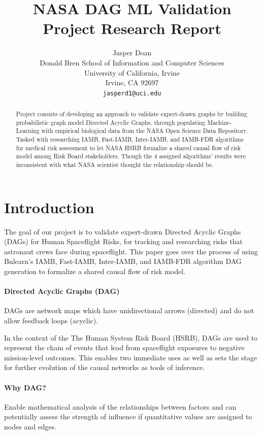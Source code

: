 \documentclass{article}
\title{NASA DAG ML Validation Project Research Report}
\author{
  Jasper Doan \\
  Donald Bren School of Information and Computer Sciences\\
  University of California, Irvine\\
  Irvine, CA 92697 \\
  \texttt{jasperd1@uci.edu} \\
}
\begin{document}
\maketitle
\begin{abstract}
Project consists of developing an approach to validate expert-drawn graphs by building probabilistic graph model Directed Acyclic Graphs, through populating Machine-Learning with empirical biological data from the NASA Open Science Data Repository. 
Tasked with researching IAMB, Fast-IAMB, Inter-IAMB, and IAMB-FDR algorithms for medical risk assessment to let NASA HSRB formalize a shared causal flow of risk model among Risk Board stakeholders. 
Though the 4 assigned algorithms' results were inconsistent with what NASA scientist thought the relationship should be. 
\end{abstract}




\section{Introduction}
The goal of our project is to validate expert-drawn Directed Acyclic Graphs (DAGs) for Human Spaceflight Risks, for tracking and researching risks that astronaut crews face during spaceflight.
This paper goes over the process of using Bnlearn's IAMB, Fast-IAMB, Inter-IAMB, and IAMB-FDR algorithm DAG generation to formalize a shared causal flow of risk model.

\paragraph{Directed Acyclic Graphs (DAG)}
DAGs are network maps which have unidirectional arrows (directed) and do not allow feedback loops (acyclic). 

In the context of the The Human System Risk Board (HSRB), DAGs are used to represent the chain of events that lead from spaceflight exposures to negative mission-level outcomes. This enables two immediate uses as well as sets the stage for further evolution of the causal networks as tools of inference.

\paragraph{Why DAG?}
Enable mathematical analysis of the relationships between factors and can potentially assess the strength of influence if quantitative values are assigned to nodes and edges.
\end{document}
